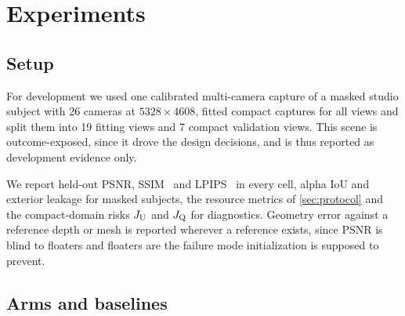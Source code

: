 \section{Experiments}
\label{sec:experiments}

\subsection{Setup}
\label{sec:exp-setup}

For development we used one calibrated multi-camera capture of a masked studio subject
with 26 cameras at $5328 \times 4608$, fitted compact captures for all views and split
them into 19 fitting views and 7 compact validation views.  This scene is outcome-exposed,
since it drove the design decisions, and is thus reported as development evidence only.

We report held-out PSNR, SSIM~\citep{wang2004_ssim} and LPIPS~\citep{zhang2018_lpips} in
every cell, alpha IoU and exterior leakage for masked subjects, the resource metrics of
\cref{sec:protocol} and the compact-domain risks $J_{\mathrm{U}}$ and $J_{\mathrm{Q}}$ for diagnostics.
Geometry error against a reference depth or mesh is reported wherever a reference exists,
since PSNR is blind to floaters and floaters are the failure mode initialization is
supposed to prevent.

\subsection{Arms and baselines}
\label{sec:exp-baselines}

